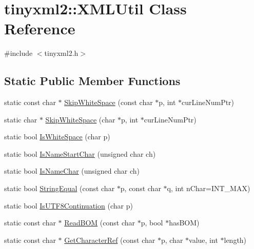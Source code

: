 \hypertarget{classtinyxml2_1_1_x_m_l_util}{}\section{tinyxml2\+:\+:X\+M\+L\+Util Class Reference}
\label{classtinyxml2_1_1_x_m_l_util}


{\ttfamily \#include $<$tinyxml2.\+h$>$}

\subsection*{Static Public Member Functions}
\begin{DoxyCompactItemize}
\item 
static const char $\ast$ \mbox{\hyperlink{classtinyxml2_1_1_x_m_l_util_ab626a194b3523a5ba8b9dbaa2a165202}{Skip\+White\+Space}} (const char $\ast$p, int $\ast$cur\+Line\+Num\+Ptr)
\item 
static char $\ast$ \mbox{\hyperlink{classtinyxml2_1_1_x_m_l_util_abb6cb3e71f88efca82cb7157367fd91e}{Skip\+White\+Space}} (char $\ast$p, int $\ast$cur\+Line\+Num\+Ptr)
\item 
static bool \mbox{\hyperlink{classtinyxml2_1_1_x_m_l_util_a357ec3af8fc433d19023a815f45e8e33}{Is\+White\+Space}} (char p)
\item 
static bool \mbox{\hyperlink{classtinyxml2_1_1_x_m_l_util_abe106a69ac4d942a4381a4d9dfd0e0bd}{Is\+Name\+Start\+Char}} (unsigned char ch)
\item 
static bool \mbox{\hyperlink{classtinyxml2_1_1_x_m_l_util_a04b17341538fa11752f24b4301d19485}{Is\+Name\+Char}} (unsigned char ch)
\item 
static bool \mbox{\hyperlink{classtinyxml2_1_1_x_m_l_util_acfcd287cacfd2533e1bc9ea4dfb56602}{String\+Equal}} (const char $\ast$p, const char $\ast$q, int n\+Char=I\+N\+T\+\_\+\+M\+AX)
\item 
static bool \mbox{\hyperlink{classtinyxml2_1_1_x_m_l_util_ad7fd82e0fe610d73ef7bf9f359f104a3}{Is\+U\+T\+F8\+Continuation}} (char p)
\item 
static const char $\ast$ \mbox{\hyperlink{classtinyxml2_1_1_x_m_l_util_ae9bcb2bc3cd6475fdc644c8c17790555}{Read\+B\+OM}} (const char $\ast$p, bool $\ast$has\+B\+OM)
\item 
static const char $\ast$ \mbox{\hyperlink{classtinyxml2_1_1_x_m_l_util_a5a96e5144a8d693dc4bcd783d9964648}{Get\+Character\+Ref}} (const char $\ast$p, char $\ast$value, int $\ast$length)
\item 

\end{DoxyCompactItemize}
